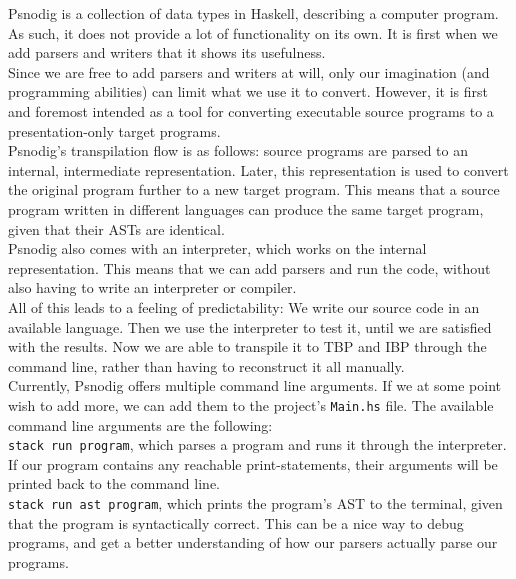 Psnodig is a collection of data types in Haskell, describing a computer program. As such, it does not provide a lot of functionality on its own. It is first when we add parsers and writers that it shows its usefulness. \\

Since we are free to add parsers and writers at will, only our imagination (and programming abilities) can limit what we use it to convert. However, it is first and foremost intended as a tool for converting executable source programs to a presentation-only target programs. \\

Psnodig's transpilation flow is as follows: source programs are parsed to an internal, intermediate representation. Later, this representation is used to convert the original program further to a new target program. This means that a source program written in different languages can produce the same target program, given that their ASTs are identical. \\

Psnodig also comes with an interpreter, which works on the internal representation. This means that we can add parsers and run the code, without also having to write an interpreter or compiler. \\

All of this leads to a feeling of predictability: We write our source code in an available language. Then we use the interpreter to test it, until we are satisfied with the results. Now we are able to transpile it to TBP and IBP through the command line, rather than having to reconstruct it all manually. \\

Currently, Psnodig offers multiple command line arguments. If we at some point wish to add more, we can add them to the project's \texttt{Main.hs} file. The available command line arguments are the following: \\

\texttt{stack run program}, which parses a program and runs it through the interpreter. If our program contains any reachable print-statements, their arguments will be printed back to the command line. \\

\texttt{stack run ast program}, which prints the program's AST to the terminal, given that the program is syntactically correct. This can be a nice way to debug programs, and get a better understanding of how our parsers actually parse our programs. \\

